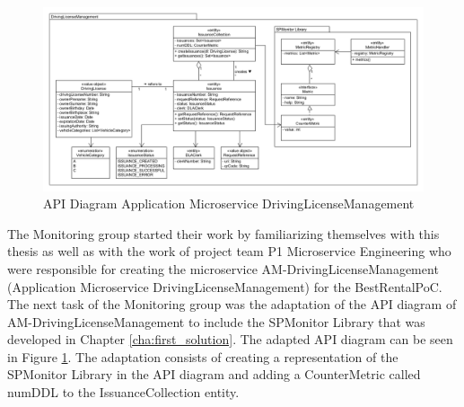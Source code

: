 \begin{figure}[tb]
	\centering
	\includegraphics[width=\textwidth]{figures/api_diagram_drivinglicensemanagement.png}
	\caption{API Diagram Application Microservice DrivingLicenseManagement}
	\label{fig:api_diagram_drivinglicensemanagement_p3}
\end{figure}

The Monitoring group started their work by familiarizing themselves with this thesis as well as with the work
of project team P1 Microservice Engineering who were responsible for creating the microservice
AM-DrivingLicenseManagement (Application Microservice DrivingLicenseManagement) for the BestRentalPoC.
The next task of the Monitoring group was the adaptation of the API diagram of AM-DrivingLicenseManagement
to include the SPMonitor Library that was developed in Chapter \ref{cha:first_solution}.
The adapted API diagram can be seen in Figure \ref{fig:api_diagram_drivinglicensemanagement_p3}.
The adaptation consists of creating a representation of the SPMonitor Library in the API diagram
and adding a CounterMetric called numDDL to the IssuanceCollection entity.

